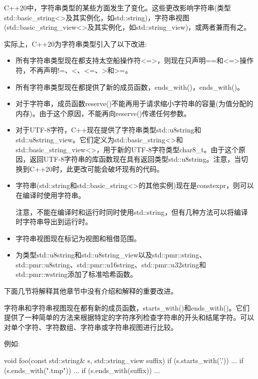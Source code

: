 
C++20中，字符串类型的某些方面发生了变化。这些更改影响字符串(类型std::basic\_string<>及其实例化，如std::string)，字符串视图(std::basic\_string\_view<>及其实例化，如std::string\_view)，或两者兼而有之。

实际上，C++20为字符串类型引入了以下改进:

\begin{itemize}
\item 
所有字符串类型现在都支持太空船操作符<=>，则现在只声明==和<=>操作符，不再声明!=、<、<=、>和>=。

\item 
所有字符串类型现在都提供了新的成员函数，ends\_with()，ends\_with()。

\item 
对于字符串，成员函数reserve()不能再用于请求缩小字符串的容量(为值分配的内存)。由于这个原因，不能再向reserve()传递任何参数。

\item 
对于UTF-8字符，C++现在提供了字符串类型std::u8string和std::u8string\_view。它们定义为std::basic\_string<>和std::basic\_string\_view<>，用于新的UTF-8字符类型char8\_t。由于这个原因，返回UTF-8字符串的库函数现在具有返回类型std::u8string。注意，当切换到C++20时，此更改可能会破坏现有的代码。

\item 
字符串(std::string和std::basic\_string<>的其他实例)现在是constexpr，则可以在编译时使用字符串。

注意，不能在编译时和运行时同时使用std::string，但有几种方法可以将编译时字符串导出到运行时。

\item 
字符串视图现在标记为视图和租借范围。

\item 
为类型std::u8string和std::u8string\_view以及std::pmr::string、std::pmr::u8string、std::pmr::u16string、std::pmr::u32string和std::pmr::wstring添加了标准哈希函数。
\end{itemize}

下面几节将解释其他章节中没有介绍和解释的重要改进。


字符串和字符串视图现在都有新的成员函数，starts\_with()和ends\_with()。它们提供了一种简单的方法来根据特定的字符序列检查字符串的开头和结尾字符。可以对单个字符、字符数组、字符串或字符串视图进行比较。

例如:

\begin{cpp}
void foo(const std::string& s, std::string_view suffix)
{
	if (s.starts_with('.')) {
		...
	}
	if (s.ends_with(".tmp")) {
		...
	}
	if (s.ends_with(suffix)) {
		...
	}
}
\end{cpp}

